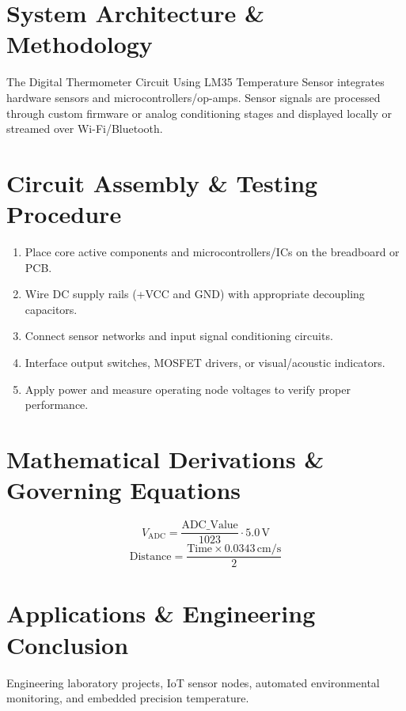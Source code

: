 \documentclass[11pt,a4paper]{article}
\begin{document}
\section{System Architecture \& Methodology}
The Digital Thermometer Circuit Using LM35 Temperature Sensor integrates hardware sensors and microcontrollers/op-amps. Sensor signals are processed through custom firmware or analog conditioning stages and displayed locally or streamed over Wi-Fi/Bluetooth.

\section{Circuit Assembly \& Testing Procedure}
\begin{enumerate}
    \item Place core active components and microcontrollers/ICs on the breadboard or PCB.
    \item Wire DC supply rails (+VCC and GND) with appropriate decoupling capacitors.
    \item Connect sensor networks and input signal conditioning circuits.
    \item Interface output switches, MOSFET drivers, or visual/acoustic indicators.
    \item Apply power and measure operating node voltages to verify proper performance.
\end{enumerate}

\section{Mathematical Derivations \& Governing Equations}
\begin{equation}
V_{\text{ADC}} = \frac{\text{ADC\_Value}}{1023} \cdot 5.0\,\text{V}
\end{equation}
\begin{equation}
\text{Distance} = \frac{\text{Time} \times 0.0343\,\text{cm/s}}{2}
\end{equation}

\section{Applications \& Engineering Conclusion}
Engineering laboratory projects, IoT sensor nodes, automated environmental monitoring, and embedded precision temperature.
\end{document}
